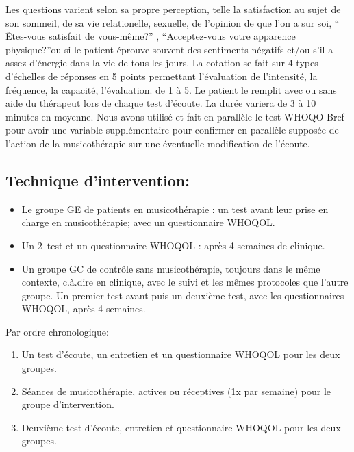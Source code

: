 Les questions varient selon sa propre perception, telle la satisfaction
au sujet de son  sommeil, de sa vie relationelle, sexuelle, de
l'opinion de que l'on a sur soi,  `` Êtes-vous satisfait de
vous-même?'' , ``Acceptez-vous votre apparence physique?''ou si le patient éprouve souvent des sentiments négatifs
et/ou s'il a assez d'énergie dans la vie de tous les jours.
La cotation se fait sur 4 types d'échelles de réponses en 5 points
permettant l'évaluation de l'intensité, la fréquence, la capacité, l'évaluation.
de 1 à 5.
Le patient le remplit avec ou sans aide du
thérapeut lors de chaque test
d'écoute. La durée variera de 3 à 10 minutes en
moyenne. 
Nous avons utilisé et fait en parallèle le test WHOQO-Bref pour avoir une variable supplémentaire pour confirmer en
parallèle supposée de l'action de la musicothérapie sur une éventuelle modification de l'écoute.


        	
        \subsection{Technique d'intervention:}


       
\begin{itemize}
	\item Le groupe GE de patients en musicothérapie : un
          test avant leur prise en charge en musicothérapie; avec un questionnaire
          WHOQOL.
          
          \item Un 2\ieme\ test et un questionnaire WHOQOL : après 4 semaines de
          clinique.
          
	\item Un groupe GC de contrôle sans musicothérapie,
	toujours dans le même contexte, c.à.dire en clinique, avec le suivi et les mêmes protocoles que l'autre groupe. Un premier test avant
 puis un deuxième test, avec les questionnaires WHOQOL, après 4 semaines. 
\end{itemize}

 Par ordre chronologique:
 
\begin{enumerate} 
        \item Un test d'écoute, un entretien et un questionnaire
          WHOQOL pour les deux groupes.
        \item Séances de musicothérapie, actives ou réceptives (1x par
          semaine) pour le groupe d'intervention.
        \item Deuxième test d'écoute, entretien et questionnaire
          WHOQOL pour les deux groupes.
\end{enumerate}

